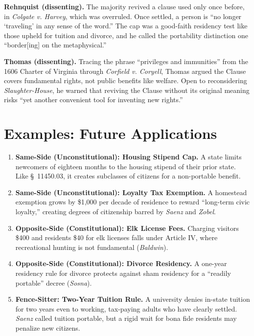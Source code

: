 \documentclass[12pt]{article}
\begin{document}
\textbf{Rehnquist (dissenting).} The majority revived a clause used only once before, in \textit{Colgate v. Harvey}, which was overruled. Once settled, a person is ``no longer `traveling' in any sense of the word.'' The cap was a good-faith residency test like those upheld for tuition and divorce, and he called the portability distinction one ``border[ing] on the metaphysical.''

\textbf{Thomas (dissenting).} Tracing the phrase ``privileges and immunities'' from the 1606 Charter of Virginia through \textit{Corfield v. Coryell}, Thomas argued the Clause covers fundamental rights, not public benefits like welfare. Open to reconsidering \textit{Slaughter-House}, he warned that reviving the Clause without its original meaning risks ``yet another convenient tool for inventing new rights.''

\section{Examples: Future Applications}

\begin{enumerate}
\item \textbf{Same-Side (Unconstitutional): Housing Stipend Cap.} A state limits newcomers of eighteen months to the housing stipend of their prior state. Like \S~11450.03, it creates subclasses of citizens for a non-portable benefit.
\item \textbf{Same-Side (Unconstitutional): Loyalty Tax Exemption.} A homestead exemption grows by \$1,000 per decade of residence to reward ``long-term civic loyalty,'' creating degrees of citizenship barred by \textit{Saenz} and \textit{Zobel}.
\item \textbf{Opposite-Side (Constitutional): Elk License Fees.} Charging visitors \$400 and residents \$40 for elk licenses falls under Article IV, where recreational hunting is not fundamental (\textit{Baldwin}).
\item \textbf{Opposite-Side (Constitutional): Divorce Residency.} A one-year residency rule for divorce protects against sham residency for a ``readily portable'' decree (\textit{Sosna}).
\item \textbf{Fence-Sitter: Two-Year Tuition Rule.} A university denies in-state tuition for two years even to working, tax-paying adults who have clearly settled. \textit{Saenz} called tuition portable, but a rigid wait for bona fide residents may penalize new citizens.
\end{enumerate}
\end{document}
